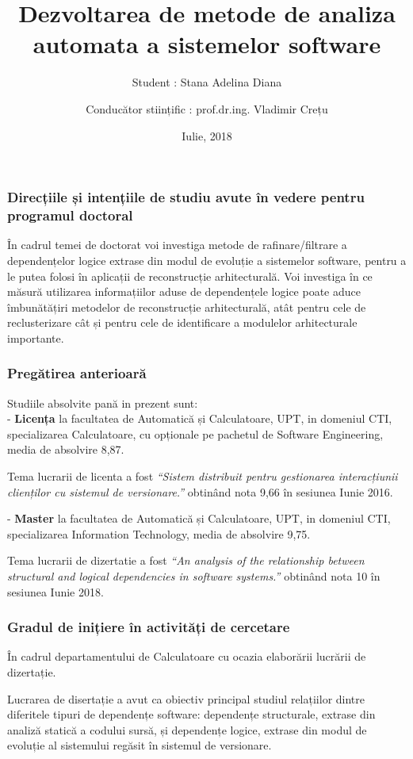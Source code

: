 \documentclass{beamer}
\title[Pres]{Dezvoltarea de metode de analiza automata a sistemelor software}
\author{Student : Stana Adelina Diana}
\author{Conducător stiințific :  prof.dr.ing. Vladimir Crețu}
\institute{Computer Science and Engineering Department\\
"Politehnica" University of Timisoara}
\date{Iulie, 2018}
\begin{document}
\begin{frame}
  \titlepage
\end{frame}

 \begin{frame}
\frametitle{Direcțiile și intențiile de studiu avute în vedere pentru programul doctoral}
În cadrul temei de doctorat voi investiga metode de rafinare/filtrare a dependențelor logice extrase din modul de evoluție a sistemelor software, pentru a le putea folosi în aplicații de reconstrucție arhitecturală. Voi investiga în ce măsură utilizarea informațiilor aduse de dependențele logice poate aduce îmbunătățiri metodelor de reconstrucție arhitecturală, atât pentru cele de reclusterizare cât și pentru cele de identificare a modulelor arhitecturale importante.

\end{frame}

 \begin{frame}
\frametitle{Pregătirea anterioară}

Studiile absolvite pană in prezent sunt:\\
- \textbf{Licența} la facultatea de Automatică și Calculatoare, UPT, in domeniul CTI, specializarea Calculatoare, cu opționale pe pachetul de Software Engineering, media de absolvire 8,87.

Tema lucrarii de licenta a fost \textit{“Sistem distribuit pentru gestionarea interacțiunii clienților cu sistemul de versionare.”} obtinând nota 9,66  în sesiunea Iunie 2016.

- \textbf{Master} la facultatea de Automatică și Calculatoare, UPT, in domeniul CTI, specializarea Information Technology, media de absolvire 9,75. 

Tema lucrarii de dizertatie a fost \textit{“An analysis of the relationship between structural and logical dependencies in software systems.”} obtinând nota 10 în sesiunea Iunie 2018.

\end{frame}


 \begin{frame}
\frametitle{Gradul de inițiere în activități de cercetare}
\begin{block}{}
În cadrul departamentului de Calculatoare cu ocazia elaborării lucrării de dizertație. 
\end{block}

Lucrarea de disertație a avut ca obiectiv principal studiul relațiilor dintre diferitele tipuri de dependențe software: dependențe structurale, extrase din analiză statică a codului sursă, și dependențe logice, extrase din modul de evoluție al sistemului regăsit  în sistemul de versionare.
\end{frame}
\end{document}
